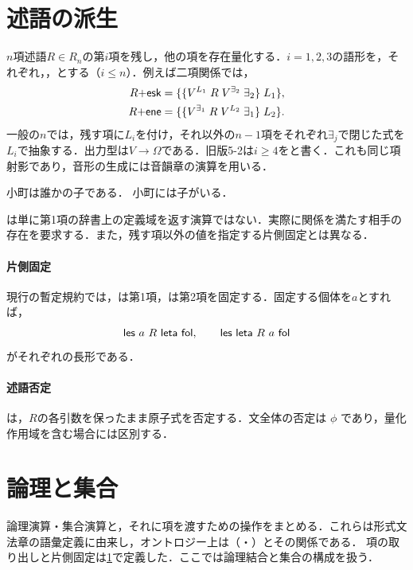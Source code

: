 \documentclass[../../main-detail.tex]{subfiles}
\begin{document}
\section{述語の派生}\label{sec:practice-derivation}
\begin{definition}[存在量化による項の取り出し]
$n$項述語$R\in R_n$の第$i$項を残し，他の項を存在量化する．$i=1,2,3$の語形を，それぞれ，，とする（$i\leq n$）．例えば二項関係では，
\begin{align*}
 \textsf{$R$+esk}&=\{\{V^{L_1}\;R\;V^{\exists_2}\;\exists_2\}\;L_1\},\\
 \textsf{$R$+ene}&=\{\{V^{\exists_1}\;R\;V^{L_2}\;\exists_1\}\;L_2\}.
\end{align*}
一般の$n$では，残す項に$L_i$を付け，それ以外の$n-1$項をそれぞれ$\exists_j$で閉じた式を$L_i$で抽象する．出力型は$V\to\Omega$である．旧版5-2は$i\geq4$をと書く．これも同じ項射影であり，音形の生成には音韻章の演算を用いる．
\end{definition}
\begin{exe}
 \ex {}\hfill 小町は誰かの子である．
 \ex {}\hfill 小町には子がいる．
\end{exe}
\begin{remark}
は単に第1項の辞書上の定義域を返す演算ではない．実際に関係を満たす相手の存在を要求する．また，残す項以外の値を指定する片側固定とは異なる．
\end{remark}
\paragraph{片側固定}
現行の暫定規約では，は第1項，は第2項を固定する．固定する個体を$a$とすれば，
\[
 \textsf{les $a$ $R$ leta fol},\qquad
 \textsf{les leta $R$ $a$ fol}
\]
がそれぞれの長形である．
\paragraph{述語否定}
は，$R$の各引数を保ったまま原子式を否定する．文全体の否定は $\phi$ であり，量化作用域を含む場合には区別する．

\section{論理と集合}\label{sec:practice-logic}
論理演算・集合演算と，それに項を渡すための操作をまとめる．これらは形式文法章の語彙定義に由来し，オントロジー上は（・）とその関係である．
項の取り出しと片側固定は\ref{sec:practice-derivation}で定義した．ここでは論理結合と集合の構成を扱う．
\end{document}
